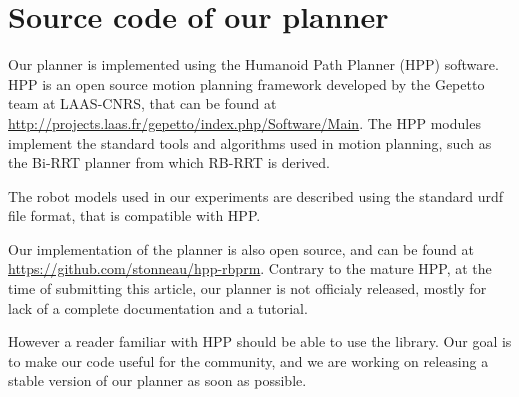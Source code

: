 \section{Source code of our planner}
\label{app:hpp}
Our planner is implemented using the Humanoid Path Planner (HPP) software.
HPP is an open source motion planning framework developed by the Gepetto team at LAAS-CNRS, that can be found at \url{http://projects.laas.fr/gepetto/index.php/Software/Main}.
The HPP modules implement the standard tools and algorithms used in motion planning,
such as the Bi-RRT planner from which RB-RRT is derived.

The robot models used in our experiments are described using the standard urdf file format, that is 
compatible with HPP.

Our implementation of the planner is also open source, and can be found at \url{https://github.com/stonneau/hpp-rbprm}. 
Contrary to the mature HPP, at the time of submitting this article,
our planner is not officialy released, mostly for lack of a complete documentation and a tutorial.

However a reader familiar with HPP should be able to use the library.
Our goal is to make our code useful for the community, and we are working on releasing a stable 
version of our planner as soon as possible.
